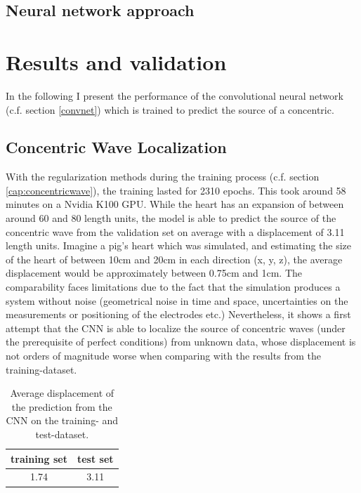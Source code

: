 \subsection{Neural network approach}

\section{Results and validation}
In the following I present the performance of the convolutional neural network (c.f. section \ref{convnet}) which is trained to predict the source of a concentric.
\subsection{Concentric Wave Localization} 
With the regularization methods during the training process (c.f. section \ref{cap:concentricwave}), the training lasted for 2310 epochs. This took around 58 minutes on a Nvidia K100 GPU. While the heart has an expansion of between around 60 and 80 length units, the model is able to predict the source of the concentric wave from the validation set on average with a displacement of 3.11 length units. Imagine a pig's heart which was simulated, and estimating the size of the heart of between 10cm and 20cm in each direction (x, y, z), the average displacement would be approximately between 0.75cm and 1cm. The comparability faces limitations due to the fact that the simulation produces a system without noise (geometrical noise in time and space, uncertainties on the measurements or positioning of the electrodes etc.) Nevertheless, it shows a first attempt that the CNN is able to localize the source of concentric waves (under the prerequisite of perfect conditions) from unknown data, whose displacement is not orders of magnitude worse when comparing with the results from the training-dataset.\\

\begin{table}[h]
    \centering
    \begin{tabular}{|c|c|}
    \hline
    training set & test set\\
    \hline
    1.74 & 3.11 \\
    \hline
    \end{tabular}
    \caption{Average displacement of the prediction from the CNN on the training- and test-dataset.}
    \label{tab:convarchitec}
\end{table}

